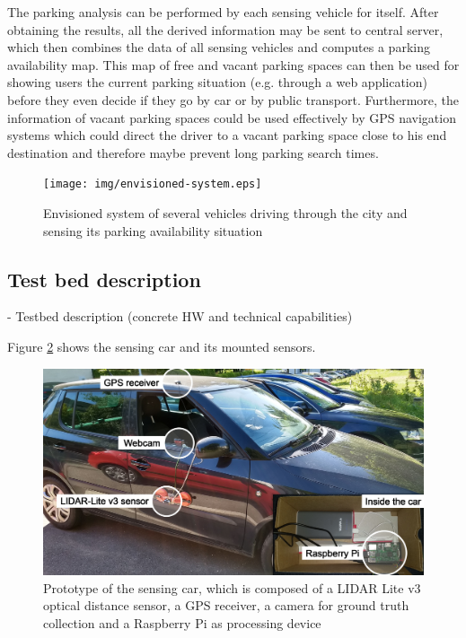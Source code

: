 The parking analysis can be performed by each sensing vehicle for itself. After obtaining the results, all the derived information may be sent to central server, which then combines the data of all sensing vehicles and computes a parking availability map. This map of free and vacant parking spaces can then be used for showing users the current parking situation (e.g. through a web application) before they even decide if they go by car or by public transport. Furthermore, the information of vacant parking spaces could be used effectively by GPS navigation systems which could direct the driver to a vacant parking space close to his end destination and therefore maybe prevent long parking search times.

\begin{figure}
	\centering
	\texttt{[image: img/envisioned-system.eps]}
	\caption{Envisioned system of several vehicles driving through the city and sensing its parking availability situation}
	\label{fig:envisioned_system}
\end{figure}

\subsection{Test bed description}
\label{sec:test_bed}

- Testbed description (concrete HW and technical capabilities)

Figure \ref{fig:sensing_car} shows the sensing car and its mounted sensors. 

\begin{figure}
	\centering
	\includegraphics[width=\textwidth]{img/car.jpg}
	\caption{Prototype of the sensing car, which is composed of a LIDAR Lite v3 optical distance sensor, a GPS receiver, a camera for ground truth collection and a Raspberry Pi as processing device}
	\label{fig:sensing_car}
\end{figure}



